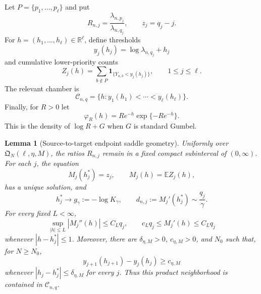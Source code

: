\documentclass[11pt]{article}
\newtheorem{lemma}[theorem]{Lemma}
\theoremstyle{remark}
\newcommand{\Ee}{\mathbb E}
\newcommand{\one}{\mathbf 1}
\begin{document}
Let $P=\{p_1,\ldots,p_\ell\}$ and put
\[
        R_{n,j}=\frac{\lambda_{n,p_j}}{\lambda_{n,q_j}},
        \qquad
        z_j=q_j-j.
\]
For $h=(h_1,\ldots,h_\ell)\in\mathbb R^\ell$, define thresholds
\[
        y_j(h_j)=\log\lambda_{n,q_j}+h_j
\]
and cumulative lower-priority counts
\[
        Z_j(h)=\sum_{b\notin P}
        \one_{\{Y_{n,b}<y_j(h_j)\}},
        \qquad 1\le j\le\ell.
\]
The relevant chamber is
\[
        \mathscr C_{n,q}
        =\{h:y_1(h_1)<\cdots<y_\ell(h_\ell)\}.
\]
Finally, for $R>0$ let
\[
        \varphi_R(h)=R e^{-h}\exp\{-R e^{-h}\}.
\tag{10.2}\label{eq:shifted-gumbel-density}
\]
This is the density of $\log R+G$ when $G$ is standard Gumbel.

\begin{lemma}[Source-to-target endpoint saddle geometry]
\label{lem:endpoint-point-saddle}
Uniformly over $\mathfrak Q_N(\ell,\eta,M)$, the ratios $R_{n,j}$ remain in a
fixed compact subinterval of $(0,\infty)$.  For each $j$, the equation
\[
        M_j(h_j^*)=z_j,
        \qquad
        M_j(h)=\Ee Z_j(h),
\tag{10.3}\label{eq:endpoint-point-saddle-equation}
\]
has a unique solution, and
\[
        h_j^*\longrightarrow g_\gamma:=-\log K_\gamma,
        \qquad
        d_{n,j}:=M_j'(h_j^*)\sim\frac{q_j}{\gamma}.
\tag{10.4}\label{eq:endpoint-point-saddle-asymptotics}
\]
For every fixed $L<\infty$,
\[
        \sup_{|h|\le L}|M_j''(h)|\le C_Lq_j,
        \qquad
        c_Lq_j\le M_j'(h)\le C_Lq_j
\tag{10.5}\label{eq:endpoint-point-mean-derivatives}
\]
whenever $|h-h_j^*|\le1$.  Moreover, there are
$\delta_{\eta,M}>0$, $c_{\eta,M}>0$, and $N_0$ such that, for $N\ge N_0$,
\[
        y_{j+1}(h_{j+1})-y_j(h_j)\ge c_{\eta,M}
\tag{10.6}\label{eq:endpoint-point-chamber-margin}
\]
whenever $|h_j-h_j^*|\le\delta_{\eta,M}$ for every $j$.  Thus this product
neighborhood is contained in $\mathscr C_{n,q}$.
\end{lemma}
\end{document}
